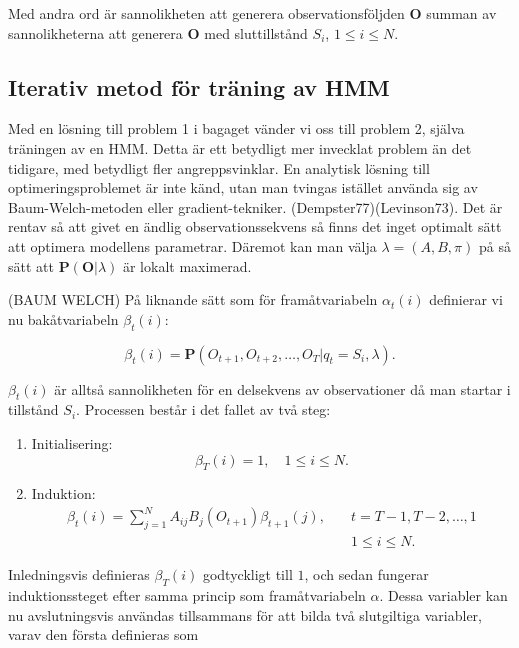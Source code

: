 \documentclass[../rapport_MVEX01-11-05]{subfiles}
\begin{document}
Med andra ord är sannolikheten att generera observationsföljden
$\textbf{O}$ summan av sannolikheterna att generera $\textbf{O}$ med
sluttillstånd $S_i$, $1 \leq i \leq N$.

\subsection{Iterativ metod för träning av HMM}

Med en lösning till problem 1 i bagaget vänder vi oss till problem 2,
själva träningen av en HMM. Detta är ett betydligt mer invecklat
problem än det tidigare, med betydligt fler angreppsvinklar. En
analytisk lösning till optimeringsproblemet är inte känd, utan man
tvingas istället använda sig av Baum-Welch-metoden eller
gradient-tekniker. (Dempster77)(Levinson73). Det är rentav så att
givet en ändlig observationssekvens så finns det inget optimalt sätt
att optimera modellens parametrar. Däremot kan man välja $\lambda =
(A,B,\pi)$ på så sätt att $\textbf{P}(\textbf{O}|\lambda)$ är lokalt
maximerad. 


(BAUM WELCH) På liknande sätt som för framåtvariabeln $\alpha_t(i)$
definierar vi nu bakåtvariabeln $\beta_t(i)$: 

\begin{equation*}
\beta_t(i) = \textbf{P}(O_{t+1},O_{t+2},\dots,O_T | q_t = S_i, \lambda).
\end{equation*} 

$\beta_t(i)$ är alltså sannolikheten för en delsekvens av
observationer då man startar i tillstånd $S_i$. Processen består i det
fallet av två steg:

\begin{enumerate}
\item Initialisering: 
\begin{equation*}
\beta_T(i) = 1, \quad 1 \leq i \leq N.
\end{equation*}
\item Induktion: 
\begin{align*}
\beta_t(i) = \sum\limits_{j=1}^NA_{ij}B_j(O_{t+1})\beta_{t+1}(j), \quad &t =
T-1,T-2,\dots,1 \\
&1 \leq i \leq N.
\end{align*}
\end{enumerate}  

Inledningsvis definieras $\beta_T(i)$ godtyckligt till $1$, och sedan
fungerar induktionssteget efter samma princip som framåtvariabeln
$\alpha$. Dessa variabler kan nu avslutningsvis användas tillsammans
för att bilda två slutgiltiga variabler, varav den första definieras som 
\end{document}
